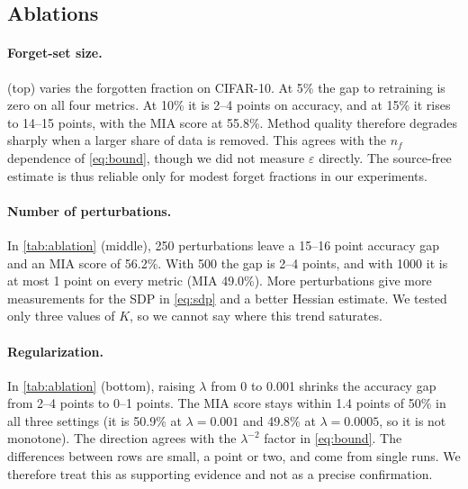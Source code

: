 \documentclass[10pt,twocolumn,letterpaper]{article}
\begin{document}
\subsection{Ablations}
\label{sec:ablations}
\paragraph{Forget-set size.}
 (top) varies the forgotten fraction on CIFAR-10. At 5\% the gap to retraining is zero on all four metrics. At 10\% it is 2--4 points on accuracy, and at 15\% it rises to 14--15 points, with the MIA score at 55.8\%. Method quality therefore degrades sharply when a larger share of data is removed. This agrees with the $n_f$ dependence of \cref{eq:bound}, though we did not measure $\varepsilon$ directly. The source-free estimate is thus reliable only for modest forget fractions in our experiments.

\paragraph{Number of perturbations.}
In \cref{tab:ablation} (middle), 250 perturbations leave a 15--16 point accuracy gap and an MIA score of 56.2\%. With 500 the gap is 2--4 points, and with 1000 it is at most 1 point on every metric (MIA 49.0\%). More perturbations give more measurements for the SDP in \cref{eq:sdp} and a better Hessian estimate. We tested only three values of $K$, so we cannot say where this trend saturates.

\paragraph{Regularization.}
In \cref{tab:ablation} (bottom), raising $\lambda$ from 0 to 0.001 shrinks the accuracy gap from 2--4 points to 0--1 points. The MIA score stays within 1.4 points of 50\% in all three settings (it is 50.9\% at $\lambda=0.001$ and 49.8\% at $\lambda=0.0005$, so it is not monotone). The direction agrees with the $\lambda^{-2}$ factor in \cref{eq:bound}. The differences between rows are small, a point or two, and come from single runs. We therefore treat this as supporting evidence and not as a precise confirmation.
\end{document}

